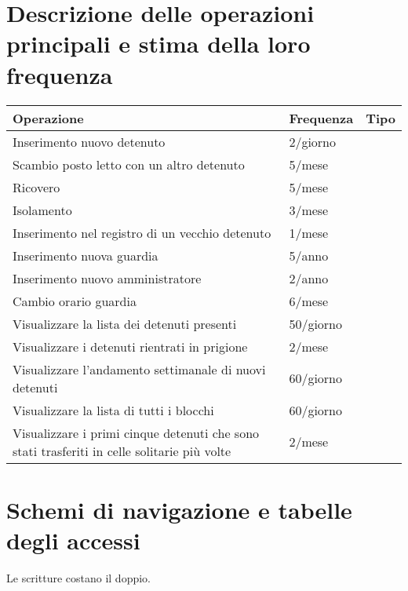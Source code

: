 \documentclass[a4paper,12pt]{report}
\begin{document}
\section{Descrizione delle operazioni principali e stima della loro frequenza}
\begin{table}[H]
\begin{tabular}{p{9cm} p{2cm} p{1cm}}
\hline
Operazione & Frequenza & Tipo \\ \hline
Inserimento nuovo detenuto & 2/giorno &  \\
Scambio posto letto con un altro detenuto & 5/mese &  \\
Ricovero & 5/mese & \\
Isolamento & 3/mese & \\
Inserimento nel registro di un vecchio detenuto & 1/mese & \\
Inserimento nuova guardia & 5/anno & \\
Inserimento nuovo amministratore & 2/anno & \\
Cambio orario guardia & 6/mese & \\
Visualizzare la lista dei detenuti presenti & 50/giorno & \\
Visualizzare i detenuti rientrati in prigione & 2/mese & \\
Visualizzare l'andamento settimanale di nuovi detenuti & 60/giorno & \\
Visualizzare la lista di tutti i blocchi & 60/giorno & \\
Visualizzare i primi cinque detenuti che sono stati trasferiti in celle solitarie più volte & 2/mese &
\end{tabular}
\end{table}
\section{Schemi di navigazione e tabelle degli accessi}
Le scritture costano il doppio.
\end{document}

